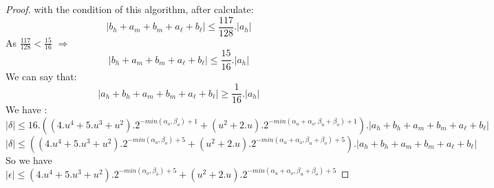 \begin{proof}
with the condition of this algorithm, after calculate:
$$\lvert b_h + a_m +b_m + a_{\ell} + b_{\ell} \rvert \le \frac{117}{128}.\lvert a_h \rvert $$
As $\frac{117}{128} < \frac{15}{16} $ $\Rightarrow$
$$\lvert b_h + a_m +b_m + a_{\ell} + b_{\ell} \rvert \le \frac{15}{16}.\lvert a_h \rvert $$
We can say that:
$$\lvert a_h +b_h + a_m +b_m + a_{\ell} + b_{\ell} \rvert \ge \frac{1}{16}.\lvert a_h \rvert $$ 
We have :
$$ \lvert \delta \rvert \le 16.((4.u^4 + 5.u^3+ u^2).2^{-min(\alpha_o,\beta_o)+1}  + (u^2+2.u).2^{-min(\alpha_u +\alpha_o,\beta_u +\beta_o)+1} ).\lvert a_h +b_h + a_m +b_m + a_{\ell} + b_{\ell} \rvert$$
$$ \lvert \delta \rvert \le ((4.u^4 + 5.u^3+ u^2).2^{-min(\alpha_o,\beta_o)+5}  + (u^2+2.u).2^{-min(\alpha_u +\alpha_o,\beta_u +\beta_o)+5} ).\lvert a_h +b_h + a_m +b_m + a_{\ell} + b_{\ell} \rvert$$
So we have $\lvert \epsilon \rvert \le (4.u^4 + 5.u^3+ u^2).2^{-min(\alpha_o,\beta_o)+5}  + (u^2+2.u).2^{-min(\alpha_u +\alpha_o,\beta_u +\beta_o)+5}$
\end{proof}